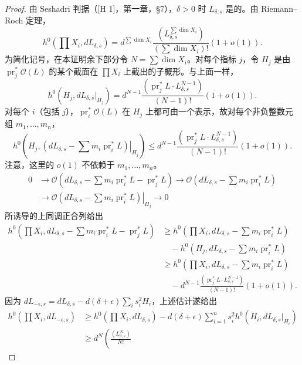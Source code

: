 \begin{proof}
由 Seshadri 判据（[H 1]，第一章，§7），$\delta>0$ 时 $L_{\delta,s}$ 是的。由 Riemann--Roch 定理，
\[
h^0\!\left(\prod X_i,dL_{\delta,s}\right)
=d^{\sum\dim X_i}\frac{(L_{\delta,s}^{\sum\dim X_i})}{(\sum\dim X_i)!}(1+o(1)).
\]
为简化记号，在本证明余下部分令 $N=\sum\dim X_i$。对每个指标 $j$，令 $H_j$ 是由 $\operatorname{pr}_j^*\mathcal O(L)$ 的某个截面在 $\prod X_i$ 上截出的子概形。与上面一样，
\[
h^0(H_j,dL_{\delta,s}|_{H_j})
=d^{N-1}\frac{(\operatorname{pr}_j^*L\cdot L_{\delta,s}^{N-1})}{(N-1)!}(1+o(1)).
\]
对每个 $i$（包括 $j$），$\operatorname{pr}_i^*\mathcal O(L)$ 在 $H_j$ 上都可由一个表示，故对每个非负整数元组 $m_1,\ldots,m_n$，
\[
h^0\!\left(H_j,\left.(dL_{\delta,s}-\sum m_i\operatorname{pr}_i^*L)\right|_{H_j}\right)
\le d^{N-1}\frac{(\operatorname{pr}_j^*L\cdot L_{\delta,s}^{N-1})}{(N-1)!}(1+o(1)).
\]
注意，这里的 $o(1)$ 不依赖于 $m_1,\ldots,m_n$。
\begin{align*}
0&\longrightarrow\mathcal O\!\left(dL_{\delta,s}-\sum m_i\operatorname{pr}_i^*L-\operatorname{pr}_j^*L\right)
\longrightarrow\mathcal O\!\left(dL_{\delta,s}-\sum m_i\operatorname{pr}_i^*L\right)\\
&\longrightarrow\left.\mathcal O\!\left(dL_{\delta,s}-\sum m_i\operatorname{pr}_i^*L\right)\right|_{H_j}\longrightarrow0
\end{align*}
所诱导的上同调正合列给出
\begin{align*}
h^0\!\left(\prod X_i,dL_{\delta,s}-\sum m_i\operatorname{pr}_i^*L-\operatorname{pr}_j^*L\right)
&\ge h^0\!\left(\prod X_i,dL_{\delta,s}-\sum m_i\operatorname{pr}_i^*L\right)\\
&\quad-h^0\!\left(H_j,dL_{\delta,s}-\sum m_i\operatorname{pr}_i^*L\right)\\
&\ge h^0\!\left(\prod X_i,dL_{\delta,s}-\sum m_i\operatorname{pr}_i^*L\right)\\
&\quad-d^{N-1}\frac{(\operatorname{pr}_j^*L\cdot L_{\delta,s}^{N-1})}{(N-1)!}(1+o(1)).
\end{align*}
因为 $dL_{-\epsilon,s}=dL_{\delta,s}-d(\delta+\epsilon)\sum_i s_i^2H_i$，上述估计遂给出
\begin{align*}
h^0\!\left(\prod X_i,dL_{-\epsilon,s}\right)
&\ge h^0\!\left(\prod X_i,dL_{\delta,s}\right)
-d(\delta+\epsilon)\sum_{i=1}^n s_i^2 h^0(H_i,dL_{\delta,s}|_{H_i})\\
&\ge d^N\left(\frac{(L_{\delta,s}^N)}{N!}

\end{align*}
\end{proof}

